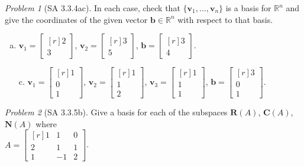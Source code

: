 \documentclass[fleqn,11pt]{paper}
\theoremstyle{remark}
\newtheorem{problem}{Problem}
\newtheorem*{solution}{{\bf Solution}}
\newcommand\R{\ensuremath{\mathbb{R}}}
\newcommand\bC{\ensuremath{\mathbf C}}
\newcommand\bN{\ensuremath{\mathbf N}}
\newcommand\bR{\ensuremath{\mathbf R}}
\renewcommand{\vec}[1]{\mathbf{#1}}
\newcommand\vb{\vec{b}}
\newcommand\vv{\vec{v}}
\begin{document}
\begin{problem}[SA 3.3.4ac]
In each case, check that $\{\vv_1 ,\dots , \vv_n \}$ 
is a basis for $\R^n$ and give the coordinates of the
given vector $\vb \in \R^n$ with respect to that basis.
\begin{enumerate}[a.]
\item 
$\vv_1 =\begin{bmatrix*}[r] 2\\3 \end{bmatrix*}$,
$\vv_2 =\begin{bmatrix*}[r] 3\\5 \end{bmatrix*}$,
$\vb =\begin{bmatrix*}[r] 3\\4 \end{bmatrix*}$.
\item[c.]
$\vv_1 =\begin{bmatrix*}[r] 1\\0\\1 \end{bmatrix*}$,
$\vv_2 =\begin{bmatrix*}[r] 1\\1\\2 \end{bmatrix*}$,
$\vv_3 =\begin{bmatrix*}[r] 1\\1\\1 \end{bmatrix*}$,
$\vb =\begin{bmatrix*}[r] 3\\0\\1 \end{bmatrix*}$.
\end{enumerate}
\end{problem}

\newpage

\begin{problem}[SA 3.3.5b]
Give a basis for each of the subspaces 
$\bR(A)$, $\bC(A)$, $\bN(A)$
where\\[4pt]
$A = \begin{bmatrix*}[r] 1&1&0\\2&1&1\\1&-1&2\end{bmatrix*}$.
\end{problem}
\end{document}
